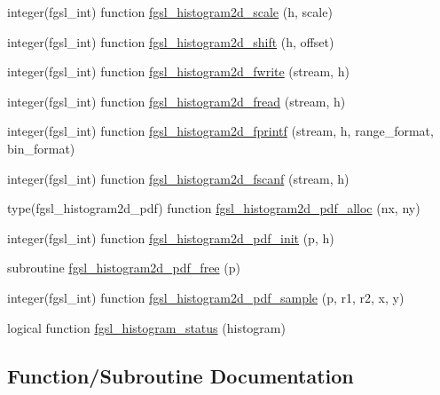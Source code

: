 \begin{DoxyCompactItemize}
\item 
integer(fgsl\+\_\+int) function \hyperlink{histogram_8finc_aa3e922748f78a89e60704fd558b87bb4}{fgsl\+\_\+histogram2d\+\_\+scale} (h, scale)
\item 
integer(fgsl\+\_\+int) function \hyperlink{histogram_8finc_a525495f254a07ea2349b86f78102433f}{fgsl\+\_\+histogram2d\+\_\+shift} (h, offset)
\item 
integer(fgsl\+\_\+int) function \hyperlink{histogram_8finc_a3ef59b4b026ab698dc81ffff9220e157}{fgsl\+\_\+histogram2d\+\_\+fwrite} (stream, h)
\item 
integer(fgsl\+\_\+int) function \hyperlink{histogram_8finc_a758daf277e6d8a5227ac3d29d2e1210c}{fgsl\+\_\+histogram2d\+\_\+fread} (stream, h)
\item 
integer(fgsl\+\_\+int) function \hyperlink{histogram_8finc_a438e52004996aea464dd46febf6bd3eb}{fgsl\+\_\+histogram2d\+\_\+fprintf} (stream, h, range\+\_\+format, bin\+\_\+format)
\item 
integer(fgsl\+\_\+int) function \hyperlink{histogram_8finc_a70db145af8c4250a8cef0ed580eda1f8}{fgsl\+\_\+histogram2d\+\_\+fscanf} (stream, h)
\item 
type(fgsl\+\_\+histogram2d\+\_\+pdf) function \hyperlink{histogram_8finc_a3c05bd287a175450294a73d0b0602f79}{fgsl\+\_\+histogram2d\+\_\+pdf\+\_\+alloc} (nx, ny)
\item 
integer(fgsl\+\_\+int) function \hyperlink{histogram_8finc_a2ab36a10d3cca3fcc3cc40e7ca494ac8}{fgsl\+\_\+histogram2d\+\_\+pdf\+\_\+init} (p, h)
\item 
subroutine \hyperlink{histogram_8finc_a08916fd4863246e82d56e495a32140fc}{fgsl\+\_\+histogram2d\+\_\+pdf\+\_\+free} (p)
\item 
integer(fgsl\+\_\+int) function \hyperlink{histogram_8finc_a49e8bf3ac9645218532bead7328c83ef}{fgsl\+\_\+histogram2d\+\_\+pdf\+\_\+sample} (p, r1, r2, x, y)
\item 
logical function \hyperlink{histogram_8finc_afed1167e78d0e89d21237ab6fca7c662}{fgsl\+\_\+histogram\+\_\+status} (histogram)
\end{DoxyCompactItemize}


\subsection{Function/\+Subroutine Documentation}
\hypertarget{histogram_8finc_a3a6eeec0c1b7597dbdf4d1ab4cafbeed}{}
